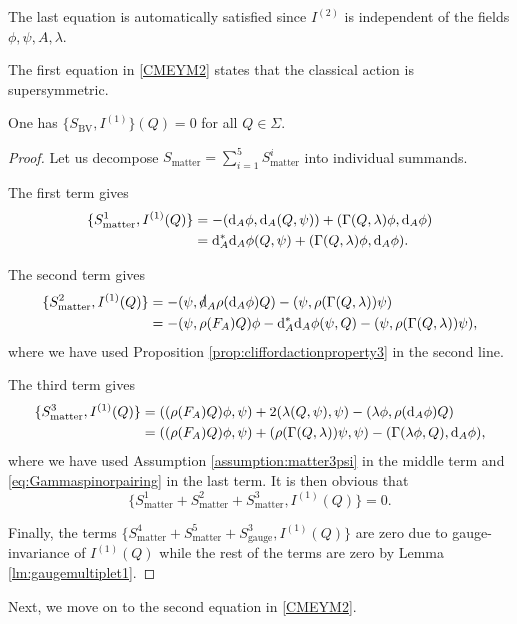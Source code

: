 \documentclass[10pt, oneside]{article}
\newcommand{\BV}{\mathrm{BV}}
\newcommand{\gauge}{\mathrm{gauge}}
\newcommand{\matter}{\mathrm{matter}}
\begin{document}
The last equation is automatically satisfied since $I^{(2)}$ is independent of the fields $\phi, \psi, A, \lambda$.

The first equation in \eqref{CMEYM2} states that the classical action is supersymmetric.

\begin{lemma} \label{lem:YM1}
One has $\{S_{\BV}, I^{(1)}\} (Q) = 0$ for all $Q \in \Sigma$. 
\end{lemma}
\begin{proof}
Let us decompose $S_{\matter}=\sum_{i=1}^5 S_{\matter}^i$ into individual summands.

The first term gives
\begin{align*}
\{S_{\matter}^1, I^{(1)}(Q)\} &= -(\d_A\phi, \d_A(Q, \psi)) + (\Gamma(Q, \lambda)\phi, \d_A\phi) \\
&= \d_A^* \d_A\phi (Q, \psi) + (\Gamma(Q, \lambda)\phi, \d_A\phi).
\end{align*}

The second term gives
\begin{align*}
\{S_{\matter}^2, I^{(1)}(Q)\} &= -(\psi, \sd \d_A \rho(\d_A \phi) Q) - (\psi, \rho(\Gamma(Q, \lambda))\psi) \\
&= -(\psi, \rho(F_A) Q)\phi - \d_A^*\d_A \phi(\psi, Q) - (\psi, \rho(\Gamma(Q, \lambda))\psi),
\end{align*}
where we have used Proposition \ref{prop:cliffordactionproperty3} in the second line.

The third term gives
\begin{align*}
\{S_{\matter}^3, I^{(1)}(Q)\} &= ((\rho(F_A)Q) \phi, \psi) + 2(\lambda(Q, \psi), \psi) - (\lambda\phi, \rho(\d_A \phi) Q) \\
&= ((\rho(F_A)Q) \phi, \psi) + (\rho(\Gamma(Q, \lambda))\psi, \psi) - (\Gamma(\lambda\phi, Q), \d_A \phi),
\end{align*}
where we have used Assumption \ref{assumption:matter3psi} in the middle term and \eqref{eq:Gammaspinorpairing} in the last term. It is then obvious that
\[\{S_{\matter}^1 + S_{\matter}^2 + S_{\matter}^3, I^{(1)}(Q)\} = 0.\]

Finally, the terms $\{S_{\matter}^4 + S_{\matter}^5 + S_{\gauge}^3, I^{(1)}(Q)\}$ are zero due to gauge-invariance of $I^{(1)}(Q)$ while the rest of the terms are zero by Lemma \ref{lm:gaugemultiplet1}.
\end{proof}

Next, we move on to the second equation in \eqref{CMEYM2}.
\end{document}
